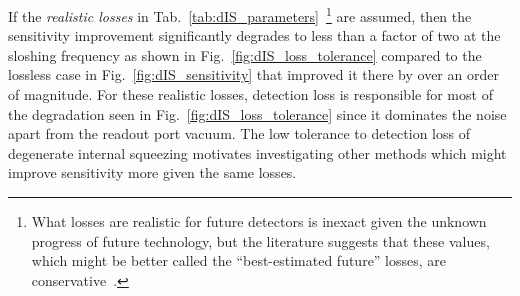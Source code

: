 If the \emph{realistic losses} in Tab.~\ref{tab:dIS_parameters}~\footnote{What losses are realistic for future detectors is inexact given the unknown progress of future technology, but the literature suggests that these values, which might be better called the ``best-estimated future'' losses, are conservative~\cite{zhangBroadbandSignalRecycling2021,flaminio2010study}.} are assumed, then the sensitivity improvement significantly degrades to less than a factor of two at the sloshing frequency as shown in Fig.~\ref{fig:dIS_loss_tolerance} compared to the lossless case in Fig.~\ref{fig:dIS_sensitivity} that improved it there by over an order of magnitude. For these realistic losses, detection loss is responsible for most of the degradation seen in Fig.~\ref{fig:dIS_loss_tolerance} since it dominates the noise apart from the readout port vacuum. %
The low tolerance to detection loss of degenerate internal squeezing motivates investigating other methods which might improve sensitivity more given the same losses. 





